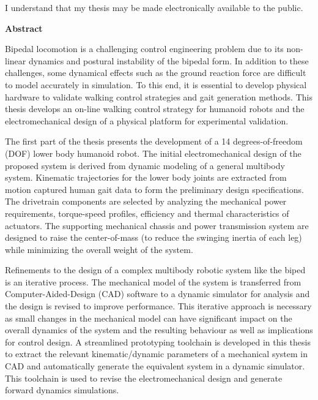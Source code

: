 \bigskip
  
\noindent
I understand that my thesis may be made electronically available to the public.

\cleardoublepage


\begin{center}
    \textbf{Abstract}
\end{center}

Bipedal locomotion is a challenging control engineering problem due to its non-linear dynamics and postural instability of the bipedal form. In addition to these challenges, some dynamical effects such as the ground reaction force are difficult to model accurately in simulation. To this end, it is essential to develop physical hardware to validate walking control strategies and gait generation methods. This thesis develops an on-line walking control strategy for humanoid robots and the electromechanical design of a physical platform for experimental validation. 

The first part of the thesis presents the development of a 14 degrees-of-freedom (DOF) lower body humanoid robot. The initial electromechanical design of the proposed system is derived from dynamic modeling of a general multibody system. Kinematic trajectories for the lower body joints are extracted from motion captured human gait data to form the preliminary design specifications. The drivetrain components are selected by analyzing the mechanical power requirements, torque-speed profiles, efficiency and thermal characteristics of actuators. The supporting mechanical chassis and power transmission system are designed to raise the center-of-mass (to reduce the swinging inertia of each leg) while minimizing the overall weight of the system. 

Refinements to the design of a complex multibody robotic system like the biped is an iterative process. The mechanical model of the system is transferred from Computer-Aided-Design (CAD) software to a dynamic simulator for analysis and the design is revised to improve performance. This iterative approach is necessary as small changes in the mechanical model can have significant impact on the overall dynamics of the system and the resulting behaviour as well as implications for control design. A streamlined prototyping toolchain is developed in this thesis to extract the relevant kinematic/dynamic parameters of a mechanical system in CAD and automatically generate the equivalent system in a dynamic simulator. This toolchain is used to revise the electromechanical design and generate forward dynamics simulations. 

